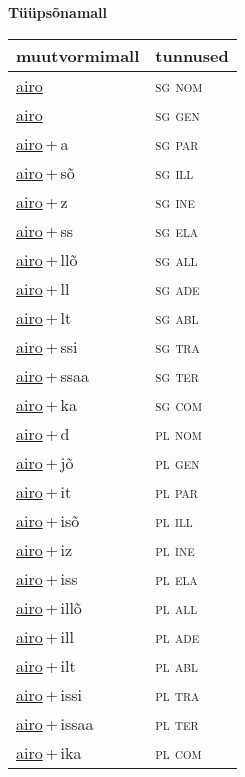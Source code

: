
\vspace{1.8em}
\begin{minipage}{\textwidth}
\textbf{Tüüpsõnamall \,}\\

\begin{sideways}
\begin{tabular}{l l}
muutvormimall & tunnused \\
\hline
\underline{airo} & \textsc{ sg nom } \\
\underline{airo} & \textsc{ sg gen } \\
\underline{airo}\,+\,a & \textsc{ sg par } \\
\underline{airo}\,+\,sõ & \textsc{ sg ill } \\
\underline{airo}\,+\,z & \textsc{ sg ine } \\
\underline{airo}\,+\,ss & \textsc{ sg ela } \\
\underline{airo}\,+\,llõ & \textsc{ sg all } \\
\underline{airo}\,+\,ll & \textsc{ sg ade } \\
\underline{airo}\,+\,lt & \textsc{ sg abl } \\
\underline{airo}\,+\,ssi & \textsc{ sg tra } \\
\underline{airo}\,+\,ssaa & \textsc{ sg ter } \\
\underline{airo}\,+\,ka & \textsc{ sg com } \\
\underline{airo}\,+\,d & \textsc{ pl nom } \\
\underline{airo}\,+\,jõ & \textsc{ pl gen } \\
\underline{airo}\,+\,it & \textsc{ pl par } \\
\underline{airo}\,+\,isõ & \textsc{ pl ill } \\
\underline{airo}\,+\,iz & \textsc{ pl ine } \\
\underline{airo}\,+\,iss & \textsc{ pl ela } \\
\underline{airo}\,+\,illõ & \textsc{ pl all } \\
\underline{airo}\,+\,ill & \textsc{ pl ade } \\
\underline{airo}\,+\,ilt & \textsc{ pl abl } \\
\underline{airo}\,+\,issi & \textsc{ pl tra } \\
\underline{airo}\,+\,issaa & \textsc{ pl ter } \\
\underline{airo}\,+\,ika & \textsc{ pl com } \\
\end{tabular}
\end{sideways}
\label{tab:tüüpsõnamall-airo}

\end{minipage}

